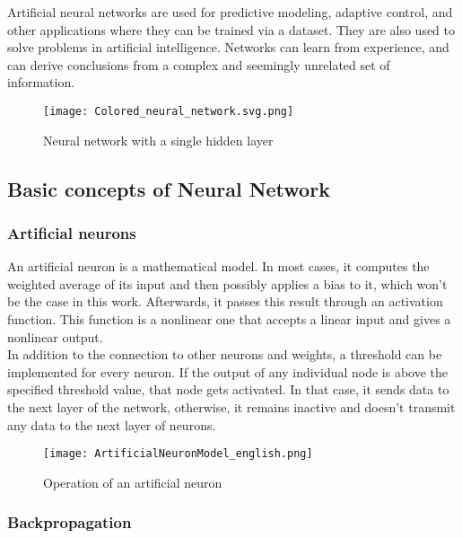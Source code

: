 \documentclass [12pt] {article}
\numberwithin{equation}{section} %
\numberwithin{figure}{section}   %
\begin{document}
Artificial neural networks are used for predictive modeling, adaptive control, and other applications where they can be trained via a dataset. They are also used to solve problems in artificial intelligence. Networks can learn from experience, and can derive conclusions from a complex and seemingly unrelated set of information.

\begin{figure}[H]
    \centering
    \texttt{[image: Colored\_neural\_network.svg.png]}
    \caption{Neural network with a single hidden layer}
\end{figure}


\subsection{Basic concepts of Neural Network}

\subsubsection*{Artificial neurons}

An artificial neuron is a mathematical model. In most cases, it computes the weighted average of its input and then possibly applies a bias to it, which won't be the case in this work. Afterwards, it passes this result through an activation function. This function is a nonlinear one that accepts a linear input and gives a nonlinear output.\\
In addition to the connection to other neurons and weights, a threshold can be implemented for every neuron. If the output of any individual node is above the specified threshold value, that node gets activated. In that case, it sends data to the next layer of the network, otherwise, it remains inactive and doesn’t transmit any data to the next layer of neurons. 
\begin{figure}[H]
    \centering
    \texttt{[image: ArtificialNeuronModel\_english.png]}
    \caption{Operation of an artificial neuron}
    \label{neuron}
\end{figure}


\subsubsection*{Backpropagation}
\end{document}
